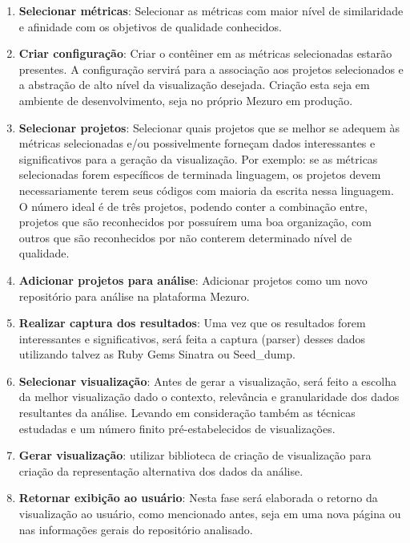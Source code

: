 \begin{enumerate}
  \item \textbf{Selecionar métricas}: Selecionar as métricas com maior nível de
  similaridade e afinidade com os objetivos de qualidade conhecidos.

  \item \textbf{Criar configuração}: Criar o contêiner em as métricas
  selecionadas estarão presentes. A configuração servirá para a associação aos
  projetos selecionados e a abstração de alto nível da visualização desejada.
  Criação esta seja em ambiente de desenvolvimento, seja no próprio Mezuro em
  produção.

  \item \textbf{Selecionar projetos}: Selecionar quais projetos que se melhor se
  adequem às métricas selecionadas e/ou possivelmente forneçam dados
  interessantes e significativos para a geração da visualização. Por exemplo:
  se as métricas selecionadas forem específicos de terminada linguagem, os
  projetos devem necessariamente terem seus códigos com maioria da escrita
  nessa linguagem. O número ideal é de três projetos, podendo conter a
  combinação entre, projetos que são reconhecidos por possuírem uma boa
  organização, com outros que são reconhecidos por não conterem determinado
  nível de qualidade.

  \item \textbf{Adicionar projetos para análise}: Adicionar projetos como um
  novo repositório para análise na plataforma Mezuro.

  \item \textbf{Realizar captura dos resultados}: Uma vez que os resultados
  forem interessantes e significativos, será feita a captura (parser) desses
  dados utilizando talvez as Ruby Gems Sinatra ou Seed\_dump.

  \item \textbf{Selecionar visualização}: Antes de gerar a visualização, será
  feito a escolha da melhor visualização dado o contexto, relevância e
  granularidade dos dados resultantes da análise. Levando em consideração também
  as técnicas estudadas e um número finito pré-estabelecidos de visualizações.

  \item \textbf{Gerar visualização}: utilizar biblioteca de criação de
  visualização para criação da representação alternativa dos dados da análise.

  \item \textbf{Retornar exibição ao usuário}: Nesta fase será elaborada o
  retorno da visualização ao usuário, como mencionado antes, seja em uma nova
  página ou nas informações gerais do repositório analisado.
\end{enumerate}

